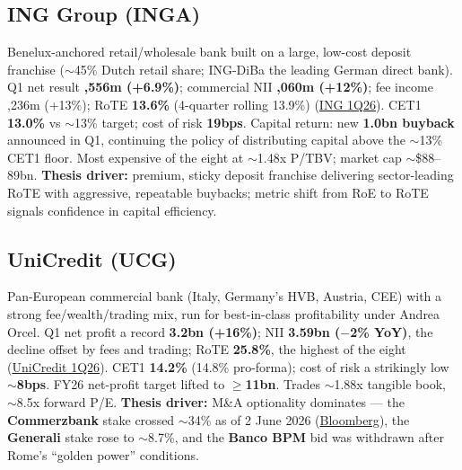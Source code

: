 \documentclass[10pt,a4paper]{article}
\begin{document}
\subsection*{ING Group (INGA)}
Benelux-anchored retail/wholesale bank built on a large, low-cost deposit franchise ($\sim$45\% Dutch retail share; ING-DiBa the leading German direct bank). Q1 net result \textbf{,556m (+6.9\%)}; commercial NII \textbf{,060m (+12\%)}; fee income ,236m (+13\%); RoTE \textbf{13.6\%} (4-quarter rolling 13.9\%) (\href{https://www.globenewswire.com/news-release/2026/04/30/3284411/0/en/}{ING 1Q26}). CET1 \textbf{13.0\%} vs $\sim$13\% target; cost of risk \textbf{19bps}. Capital return: new \textbf{\texteuro1.0bn buyback} announced in Q1, continuing the policy of distributing capital above the $\sim$13\% CET1 floor. Most expensive of the eight at $\sim$1.48x P/TBV; market cap $\sim$\$88--89bn. \textbf{Thesis driver:} premium, sticky deposit franchise delivering sector-leading RoTE with aggressive, repeatable buybacks; metric shift from RoE to RoTE signals confidence in capital efficiency.

\subsection*{UniCredit (UCG)}
Pan-European commercial bank (Italy, Germany's HVB, Austria, CEE) with a strong fee/wealth/trading mix, run for best-in-class profitability under Andrea Orcel. Q1 net profit a record \textbf{\texteuro3.2bn (+16\%)}; NII \textbf{\texteuro3.59bn ($-$2\% YoY)}, the decline offset by fees and trading; RoTE \textbf{25.8\%}, the highest of the eight (\href{https://www.unicreditgroup.eu/en/press-media/press-releases-price-sensitive/2026/may/unicredit--1q26-group-results---unlimited-off-to-a-flying-start.html}{UniCredit 1Q26}). CET1 \textbf{14.2\%} (14.8\% pro-forma); cost of risk a strikingly low $\sim$\textbf{8bps}. FY26 net-profit target lifted to \textbf{$\geq$\texteuro11bn}. Trades $\sim$1.88x tangible book, $\sim$8.5x forward P/E. \textbf{Thesis driver:} M\&A optionality dominates --- the \textbf{Commerzbank} stake crossed $\sim$34\% as of 2 June 2026 (\href{https://www.bloomberg.com/news/articles/2026-06-02/unicredit-says-commerzbank-offer-set-to-push-direct-stake-to-34}{Bloomberg}), the \textbf{Generali} stake rose to $\sim$8.7\%, and the \textbf{Banco BPM} bid was withdrawn after Rome's ``golden power'' conditions.
\end{document}
